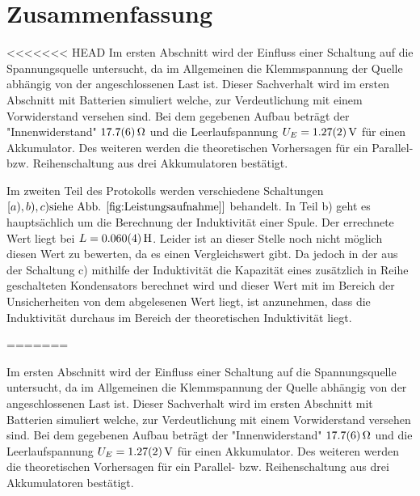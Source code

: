 
\section{Zusammenfassung}
<<<<<<< HEAD
Im ersten Abschnitt wird der Einfluss einer Schaltung auf die Spannungsquelle untersucht, da im Allgemeinen die Klemmspannung der Quelle abhängig von der angeschlossenen Last ist. Dieser Sachverhalt wird im ersten Abschnitt mit Batterien simuliert welche, zur Verdeutlichung mit einem Vorwiderstand versehen sind. Bei dem gegebenen Aufbau beträgt der "Innenwiderstand" $\SI{17.7+-0.6}{\ohm}$ und die Leerlaufspannung $U_E=\SI{1.27+-0.02}{V}$ für einen Akkumulator. Des weiteren werden die theoretischen Vorhersagen für ein Parallel- bzw. Reihenschaltung aus drei Akkumulatoren bestätigt.

Im zweiten Teil des Protokolls werden verschiedene Schaltungen  $\left[ a),b),c) \text{siehe Abb. \ref{fig:Leistungsaufnahme}} \right]$ behandelt.
In Teil b) geht es hauptsächlich um die Berechnung der Induktivität einer Spule.
Der errechnete Wert liegt bei $L= \SI{0,060+-0,004}{H}$. Leider ist an dieser Stelle noch nicht möglich diesen Wert zu bewerten, da es einen Vergleichswert gibt.
Da jedoch in der aus der Schaltung c) mithilfe der Induktivität die Kapazität eines zusätzlich in Reihe geschalteten Kondensators berechnet wird und dieser Wert mit im Bereich der Unsicherheiten von dem abgelesenen Wert liegt, ist anzunehmen, dass die Induktivität durchaus im Bereich der theoretischen Induktivität liegt.


=======

Im ersten Abschnitt wird der Einfluss einer Schaltung auf die Spannungsquelle untersucht, da im Allgemeinen die Klemmspannung der Quelle abhängig von der angeschlossenen Last ist. Dieser Sachverhalt wird im ersten Abschnitt mit Batterien simuliert welche, zur Verdeutlichung mit einem Vorwiderstand versehen sind. Bei dem gegebenen Aufbau beträgt der "Innenwiderstand" $\SI{17.7+-0.6}{\ohm}$ und die Leerlaufspannung $U_E=\SI{1.27+-0.02}{V}$ für einen Akkumulator. Des weiteren werden die theoretischen Vorhersagen für ein Parallel- bzw. Reihenschaltung aus drei Akkumulatoren bestätigt.\\



